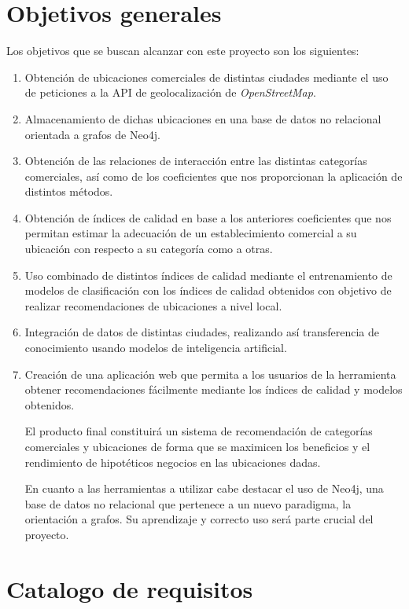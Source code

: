 \section{Objetivos generales}

Los objetivos que se buscan alcanzar con este proyecto son los siguientes:

\begin{enumerate}
	\item Obtención de ubicaciones comerciales de distintas ciudades mediante el uso de peticiones a la API de geolocalización de \textit{OpenStreetMap}.
	\item Almacenamiento de dichas ubicaciones en una base de datos no relacional orientada a grafos de Neo4j.
	\item Obtención de las relaciones de interacción entre las distintas categorías comerciales, así como de los coeficientes que nos proporcionan la aplicación de distintos métodos.
	\item Obtención de índices de calidad en base a los anteriores coeficientes que nos permitan estimar la adecuación de un establecimiento comercial a su ubicación con respecto a su categoría como a otras.
	\item Uso combinado de distintos índices de calidad mediante el entrenamiento de modelos de clasificación con los índices de calidad obtenidos con objetivo de realizar recomendaciones de ubicaciones a nivel local.
	\item Integración de datos de distintas ciudades, realizando así transferencia de conocimiento usando modelos de inteligencia artificial.
	\item Creación de una aplicación web que permita a los usuarios de la herramienta obtener recomendaciones fácilmente mediante los índices de calidad y modelos obtenidos.
	
	El producto final constituirá un sistema de recomendación de categorías comerciales y ubicaciones de forma que se maximicen los beneficios y el rendimiento de hipotéticos negocios en las ubicaciones dadas.
	
	En cuanto a las herramientas a utilizar cabe destacar el uso de Neo4j, una base de datos no relacional que pertenece a un nuevo paradigma, la orientación a grafos. Su aprendizaje y correcto uso será parte crucial del proyecto.
\end{enumerate}

\section{Catalogo de requisitos}


